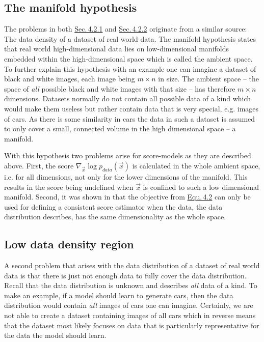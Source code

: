 \subsection{The manifold hypothesis} \label{sec:4.2.1}
The problems in both \hyperref[sec:4.2.1]{Sec.\,4.2.1} and \hyperref[sec:4.2.2]{Sec.\,4.2.2} originate from a similar source: The data density of a dataset of real world data. The manifold hypothesis states that real world high-dimensional data lies on low-dimensional manifolds embedded within the high-dimensional space which is called the ambient space. To further explain this hypothesis with an example one can imagine a dataset of black and white images, each image being $m\times n$ in size. The ambient space – the space of \textit{all} possible black and white images with that size – has therefore $m\times n$ dimensions. Datasets normally do not contain all possible data of a kind which would make them useless but rather contain data that is very special, e.g. images of cars. As there is some similarity in cars the data in such a dataset is assumed to only cover a small, connected volume in the high dimensional space – a manifold. 

With this hypothesis two problems arise for score-models as they are described above. First, the score $\nabla_{\vec{x}}\log p_{data}(\vec{x})$ is calculated in the whole ambient space, i.e. for all dimensions, not only for the lower dimensions of the manifold. This results in the score being undefined when $\vec{x}$ is confined to such a low dimensional manifold. Second, it was shown in \cite{score_matching_original} that the objective from \hyperref[equ:4.2]{Equ.\,4.2} can only be used for defining a consistent score estimator when the data, the data distribution describes, has the same dimensionality as the whole space.
%
\subsection{Low data density region}\label{sec:4.2.2}
A second problem that arises with the data distribution of a dataset of real world data is that there is just not enough data to fully cover the data distribution. Recall that the data distribution is unknown and describes \textit{all} data of a kind. To make an example, if a model should learn to generate cars, then the data distribution would contain \textit{all} images of cars one can imagine. Certainly, we are not able to create a dataset containing images of all cars which in reverse means that the dataset most likely focuses on data that is particularly representative for the data the model should learn.

